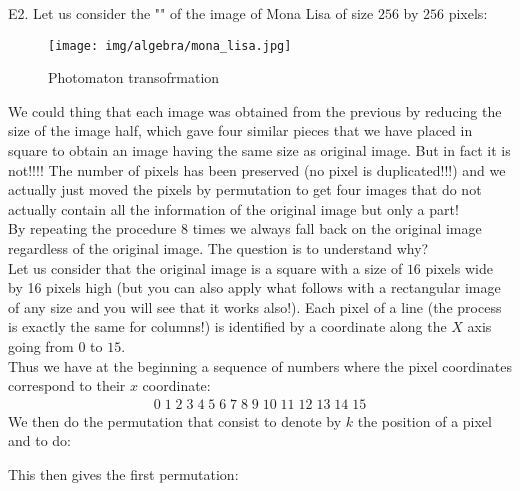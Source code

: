 	\pagebreak
	\begin{tcolorbox}[colframe=black,colback=white,sharp corners]
	E2. Let us consider the "" of the image of Mona Lisa of size $256$ by $256$ pixels:
	\begin{figure}[H]
		\centering
		\texttt{[image: img/algebra/mona\_lisa.jpg]}
		\caption{Photomaton transofrmation}
	\end{figure}
	We could thing that each image was obtained from the previous by reducing the size of the image half, which gave four similar pieces that we have placed in square to obtain an image having the same size as original image. But in fact it is not!!!! The number of pixels has been preserved (no pixel is duplicated!!!) and we actually just moved the pixels by permutation to get four images that do not actually contain all the information of the original image but only a part!\\
	
	By repeating the procedure $8$ times we always fall back on the original image regardless of the original image. The question is to understand why?\\
	
	Let us consider that the original image is a square with a size of $16$ pixels wide by 16 pixels high (but you can also apply what follows with a rectangular image of any size and you will see that it works also!). Each pixel of a line (the process is exactly the same for columns!) is identified by a coordinate along the $X$ axis going from $0$ to $15$.\\
	
	Thus we have at the beginning a sequence of numbers where the pixel coordinates correspond to their $x$ coordinate:
	\begin{gather*}
		0\; 1\; 2\; 3\; 4\; 5\; 6\; 7\; 8\; 9\; 10\; 11\; 12\; 13\; 14\; 15
	\end{gather*}
	We then do the permutation that consist to denote by $k$ the position of a pixel and to do:
	
	This then gives the first permutation:
	\end{tcolorbox}

